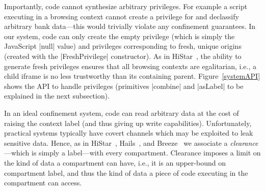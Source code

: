 Importantly, code cannot synthesize arbitrary privileges.
%
For example a script executing in a  browsing
context cannot create a privilege for  and declassify
arbitrary bank data---this would trivially violate any confinement
guarantees.
%
In our system, code can only create the empty privilege (which is
simply the JavaScript \js|null| value) and privileges corresponding
to fresh, unique origins (created with the \js|FreshPrivilege|
constructor).
%
As in HiStar~\cite{Zeldovich:2006}, the ability to generate fresh privileges
ensures that all browsing contexts are egalitarian, i.e., a child iframe is no
less trustworthy than its containing parent.  Figure~\ref{systemAPI} shows the
API to handle privileges (primitives \js|combine| and \js|asLabel| to be 
explained in the next subsection). 


In an ideal confinement system, code can read arbitrary data at the
cost of raising the context label (and thus giving up write
capabilities).
%
Unfortunately, practical systems typically have covert channels which
may be exploited to leak sensitive data.
%
Hence, as in HiStar~\cite{Zeldovich:2006}, Hails~\cite{giffin:2012:hails}, and
Breeze~\cite{Breeze13} we associate a \emph{clearance}---which is
simply a label---with every compartment.
%
Clearance imposes a limit on the kind of data a compartment can have,
i.e., it is an upper-bound on compartment label, and thus the kind of
data a piece of code executing in the compartment can access.


%


